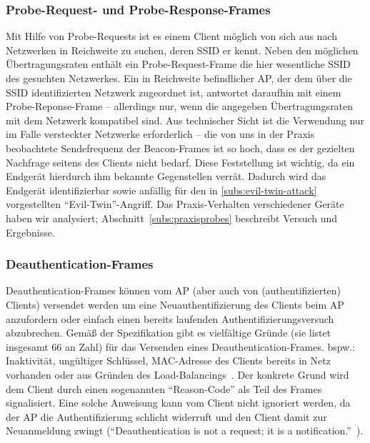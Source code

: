 \subsubsection{Probe-Request- und Probe-Response-Frames}\label{subs:probes}
Mit Hilfe von Probe-Requests ist es einem Client möglich von sich aus nach Netzwerken in Reichweite zu suchen, deren SSID er kennt. 
Neben den möglichen Übertragungsraten enthält ein Probe-Request-Frame die hier wesentliche SSID des gesuchten Netzwerkes. 
Ein in Reichweite befindlicher AP, der dem über die SSID identifizierten Netzwerk zugeordnet ist, antwortet daraufhin mit einem Probe-Reponse-Frame -- allerdings nur, wenn die angegeben Übertragungsraten mit dem Netzwerk kompatibel sind. 
Aus technischer Sicht ist die Verwendung nur im Falle versteckter Netzwerke erforderlich -- die von uns in der Praxis beobachtete Sendefrequenz der Beacon-Frames ist so hoch, dass es der gezielten Nachfrage seitens des Clients nicht bedarf. 
Diese Feststellung ist wichtig, da ein Endgerät hierdurch ihm bekannte Gegenstellen verrät. 
Dadurch wird das Endgerät identifizierbar sowie anfällig für den in \ref{subs:evil-twin-attack} vorgestellten \enquote{Evil-Twin}-Angriff. 
Das Praxis-Verhalten verschiedener Geräte haben wir analysiert; Abschnitt~\ref{subs:praxisprobes} beschreibt Versuch und Ergebnisse.

\subsubsection{Deauthentication-Frames}\label{subs:deauthentication-frames}
Deauthentication-Frames können vom AP (aber auch von (authentifizierten) Clients) versendet werden um eine Neuauthentifizierung des Clients beim AP anzufordern oder einfach einen bereits laufenden Authentifizierungsversuch abzubrechen. 
Gemäß der Spezifikation gibt es vielfältige Gründe (sie listet insgesamt 66 an Zahl) für das Versenden eines Deauthentication-Frames. bspw.: Inaktivität, ungültiger Schlüssel, MAC-Adresse des Clients bereits in Netz vorhanden oder aus Gründen des Load-Balancings~\cite[S. 74, S. 442]{ieee802.11}.
Der konkrete Grund wird dem Client durch einen sogenannten \enquote{Reason-Code} als Teil des Frames signalisiert. 
Eine solche Anweisung kann vom Client nicht ignoriert werden, da der AP die Authentifizierung schlicht widerruft und den Client damit zur Neuanmeldung zwingt (\enquote{Deauthentication is not a request; it is a notification.}~\cite[S. 74]{ieee802.11}).
 

